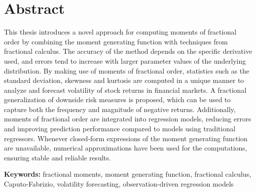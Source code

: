 \section*{Abstract}
This thesis introduces a novel approach for computing moments of fractional order by combining the moment generating function with techniques from fractional calculus. The accuracy of the method depends on the specific derivative used, and errors tend to increase with larger parameter values of the underlying distribution. By making use of moments of fractional order, statistics such as the standard deviation, skewness and kurtosis are computed in a unique manner to analyze and forecast volatility of stock returns in financial markets. A fractional generalization of downside risk measures is proposed, which can be used to capture both the frequency and magnitude of negative returns. Additionally, moments of fractional order are integrated into regression models, reducing errors and improving prediction performance compared to models using traditional regressors. Whenever closed-form expressions of the moment generating function are unavailable, numerical approximations have been used for the computations, ensuring stable and reliable results.

\bigskip\noindent
\textbf{Keywords:} fractional moments, moment generating function, fractional calculus, Caputo-Fabrizio, volatility forecasting, observation-driven regression models